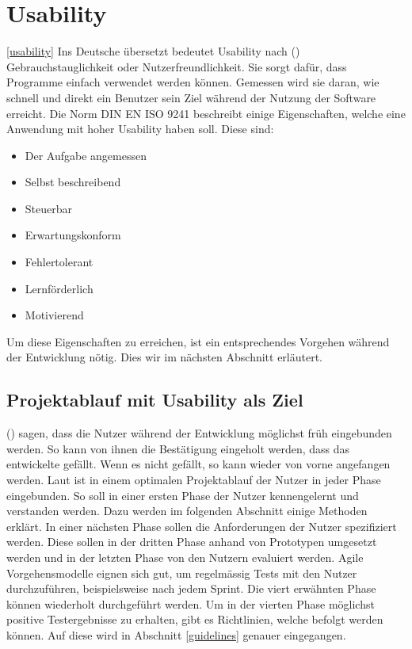 \section{Usability}\ref{usability}
Ins Deutsche übersetzt bedeutet Usability nach \citeauthor{usability} (\citeyear{usability}) Gebrauchstauglichkeit oder Nutzerfreundlichkeit.
Sie sorgt dafür, dass Programme einfach verwendet werden können.
Gemessen wird sie daran, wie schnell und direkt ein Benutzer sein Ziel während der Nutzung der Software erreicht.
Die Norm DIN EN ISO 9241 beschreibt einige Eigenschaften, welche eine Anwendung mit hoher Usability haben soll.
Diese sind:
\begin{itemize}
   \item Der Aufgabe angemessen
   \item Selbst beschreibend
   \item Steuerbar
   \item Erwartungskonform
   \item Fehlertolerant
   \item Lernförderlich
   \item Motivierend
\end{itemize}
Um diese Eigenschaften zu erreichen, ist ein entsprechendes Vorgehen während der Entwicklung nötig.
Dies wir im nächsten Abschnitt erläutert.


\subsection{Projektablauf mit Usability als Ziel}
\citeauthor{usability} (\citeyear{usability}) sagen, dass die Nutzer während der Entwicklung möglichst früh eingebunden werden.
So kann von ihnen die Bestätigung eingeholt werden, dass das entwickelte gefällt.
Wenn es nicht gefällt, so kann wieder von vorne angefangen werden.
Laut \citeauthor{usability} ist in einem optimalen Projektablauf der Nutzer in jeder Phase eingebunden.
So soll in einer ersten Phase der Nutzer kennengelernt und verstanden werden.
Dazu werden im folgenden Abschnitt einige Methoden erklärt.
In einer nächsten Phase sollen die Anforderungen der Nutzer spezifiziert werden.
Diese sollen in der dritten Phase anhand von Prototypen umgesetzt werden und in der letzten Phase von den Nutzern evaluiert werden.
Agile Vorgehensmodelle eignen sich gut, um regelmässig Tests mit den Nutzer durchzuführen, beispielsweise nach jedem Sprint.
Die viert erwähnten Phase können wiederholt durchgeführt werden.
Um in der vierten Phase möglichst positive Testergebnisse zu erhalten, gibt es Richtlinien, welche befolgt werden können.
Auf diese wird in Abschnitt \ref{guidelines} genauer eingegangen.


